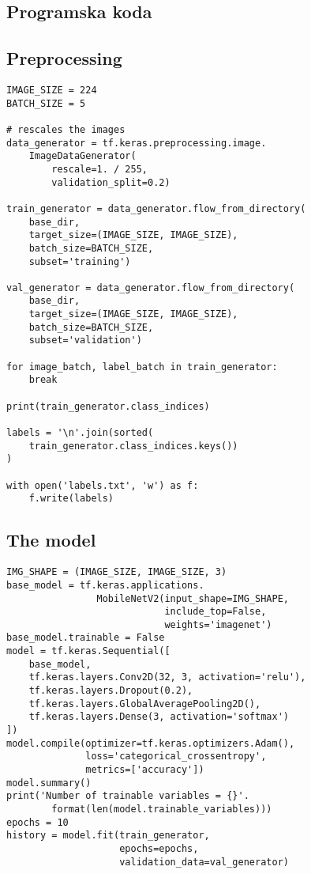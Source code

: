 \documentclass[a4paper, 12pt]{book}
\begin{document}
% 
% 

\begin{appendices}

\chapter{Programska koda}
\section{Preprocessing}
\label{appendix:Preprocessing}
\begin{lstlisting}
IMAGE_SIZE = 224
BATCH_SIZE = 5

# rescales the images
data_generator = tf.keras.preprocessing.image.
    ImageDataGenerator(
        rescale=1. / 255,
        validation_split=0.2)

train_generator = data_generator.flow_from_directory(
    base_dir,
    target_size=(IMAGE_SIZE, IMAGE_SIZE),
    batch_size=BATCH_SIZE,
    subset='training')

val_generator = data_generator.flow_from_directory(
    base_dir,
    target_size=(IMAGE_SIZE, IMAGE_SIZE),
    batch_size=BATCH_SIZE,
    subset='validation')

for image_batch, label_batch in train_generator:
    break

print(train_generator.class_indices)

labels = '\n'.join(sorted(
    train_generator.class_indices.keys())
)

with open('labels.txt', 'w') as f:
    f.write(labels)
\end{lstlisting}

\section{The model}
\label{appendix:model}
\begin{lstlisting}
IMG_SHAPE = (IMAGE_SIZE, IMAGE_SIZE, 3)
base_model = tf.keras.applications.
                MobileNetV2(input_shape=IMG_SHAPE,
                            include_top=False,
                            weights='imagenet')
base_model.trainable = False
model = tf.keras.Sequential([
    base_model, 
    tf.keras.layers.Conv2D(32, 3, activation='relu'),  
    tf.keras.layers.Dropout(0.2),  
    tf.keras.layers.GlobalAveragePooling2D(),  
    tf.keras.layers.Dense(3, activation='softmax')  
])
model.compile(optimizer=tf.keras.optimizers.Adam(),  
              loss='categorical_crossentropy', 
              metrics=['accuracy'])  
model.summary()
print('Number of trainable variables = {}'.
        format(len(model.trainable_variables)))
epochs = 10
history = model.fit(train_generator,
                    epochs=epochs,
                    validation_data=val_generator)
\end{lstlisting}


\end{appendices}
\end{document}
